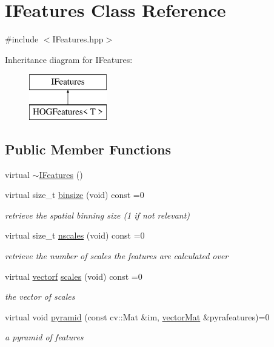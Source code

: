 \hypertarget{class_i_features}{\section{I\-Features Class Reference}
\label{class_i_features}
}


{\ttfamily \#include $<$I\-Features.\-hpp$>$}

Inheritance diagram for I\-Features\-:\begin{figure}[H]
\begin{center}
\leavevmode
\includegraphics[height=2.000000cm]{class_i_features}
\end{center}
\end{figure}
\subsection*{Public Member Functions}
\begin{DoxyCompactItemize}
\item 
virtual \hyperlink{class_i_features_a7de8c9d6739ebd4504f9d033d71c2f42}{$\sim$\-I\-Features} ()
\item 
virtual size\-\_\-t \hyperlink{class_i_features_a79f6861190d7c2754d560c6c10baa787}{binsize} (void) const =0
\begin{DoxyCompactList}\small\item\em retrieve the spatial binning size (1 if not relevant) \end{DoxyCompactList}\item 
virtual size\-\_\-t \hyperlink{class_i_features_abf8d0bf5f66e7b3188ca73b5c9e48a1f}{nscales} (void) const =0
\begin{DoxyCompactList}\small\item\em retrieve the number of scales the features are calculated over \end{DoxyCompactList}\item 
virtual \hyperlink{types_8hpp_a4da5db3ee9e284f719ef5764dbadffc8}{vectorf} \hyperlink{class_i_features_ad02aea9fd29e438d25e1c7d68c508b9e}{scales} (void) const =0
\begin{DoxyCompactList}\small\item\em the vector of scales \end{DoxyCompactList}\item 
virtual void \hyperlink{class_i_features_a0cd270503671145fae965c8d9fedc91a}{pyramid} (const cv\-::\-Mat \&im, \hyperlink{types_8hpp_a3207a7addcfa415d1c83622febcb1e9b}{vector\-Mat} \&pyrafeatures)=0
\begin{DoxyCompactList}\small\item\em a pyramid of features \end{DoxyCompactList}\end{DoxyCompactItemize}


